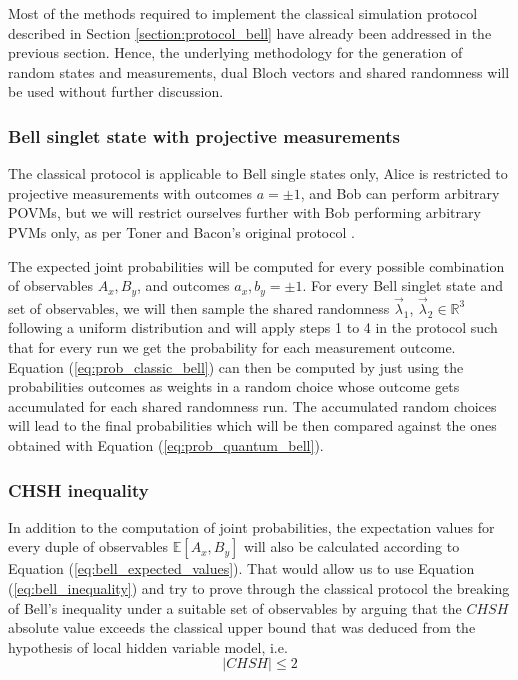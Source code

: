 Most of the methods required to implement the classical simulation protocol described in Section \ref{section:protocol_bell} have already been addressed in the previous section. Hence, the underlying methodology for the generation of random states and measurements, dual Bloch vectors and shared randomness will be used without further discussion.

\subsubsection{Bell singlet state with projective measurements}

The classical protocol is applicable to Bell single states only, Alice is restricted to projective measurements with outcomes $a=\pm1$, and Bob can perform arbitrary POVMs, but we will restrict ourselves further with Bob performing arbitrary PVMs only, as per Toner and Bacon's original protocol \cite{toner2003}.

The expected joint probabilities will be computed for every possible combination of observables $A_{x}, B_{y}$, and outcomes $a_{x}, b_{y} = \pm1$. For every Bell singlet state and set of observables, we will then sample the shared randomness $\vec{\lambda}_1$, $\vec{\lambda}_2 \in \mathbb{R}^3$ following a uniform distribution and will apply steps 1 to 4 in the protocol such that for every run we get the probability for each measurement outcome. Equation (\ref{eq:prob_classic_bell}) can then be computed by just using the probabilities outcomes as weights in a random choice whose outcome gets accumulated for each shared randomness run. The accumulated random choices will lead to the final probabilities which will be then compared against the ones obtained with Equation (\ref{eq:prob_quantum_bell}).

\subsubsection{CHSH inequality}
In addition to the computation of joint probabilities, the expectation values for every duple of observables $\mathbb{E}[A_{x}, B_{y}]$ will also be calculated according to Equation (\ref{eq:bell_expected_values}). That would allow us to use Equation (\ref{eq:bell_inequality}) and try to prove through the classical protocol the breaking of Bell's inequality under a suitable set of observables by arguing that the $\mathit{CHSH}$ absolute value exceeds the classical upper bound that was deduced from the hypothesis of local hidden variable model, i.e.
\begin{equation}\label{eq:chsh_inequality}
|\mathit{CHSH}| \leq 2
\end{equation}